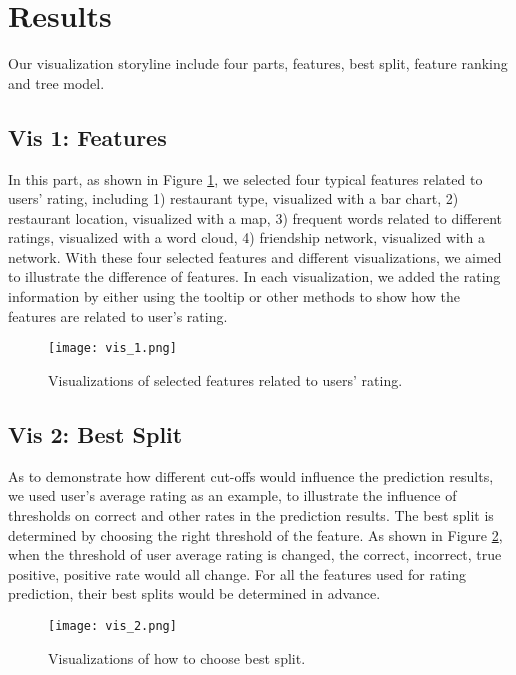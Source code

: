 \section{Results}
\label{sec:results} 

Our visualization storyline include four parts, features, best split, feature ranking and tree model. 

\subsection{Vis 1: Features}

In this part, as shown in Figure \ref{fig:vis_1}, we selected four typical features related to users' rating, including 1) restaurant type, visualized with a bar chart, 2) restaurant location, visualized with a map, 3) frequent words related to different ratings, visualized with a word cloud, 4) friendship network, visualized with a network. With these four selected features and different visualizations, we aimed to illustrate the difference of features. In each visualization, we added the rating information by either using the tooltip or other methods to show how the features are related to user's rating. 

\begin{figure}[h]
	\centering
	\texttt{[image: vis\_1.png]}
	\caption{Visualizations of selected features related to users' rating.}
	\label{fig:vis_1}
\end{figure}

\subsection{Vis 2: Best Split}

As to demonstrate how different cut-offs would influence the prediction results, we used user's average rating as an example, to illustrate the influence of thresholds on correct and other rates in the prediction results. The best split is determined by choosing the right threshold of the feature. As shown in Figure \ref{fig:vis_2}, when the threshold of user average rating is changed, the correct, incorrect, true positive, positive rate would all change. For all the features used for rating prediction, their best splits would be determined in advance. 

\begin{figure}[h]
	\centering
	\texttt{[image: vis\_2.png]}
	\caption{Visualizations of how to choose best split.}
	\label{fig:vis_2}
\end{figure}

